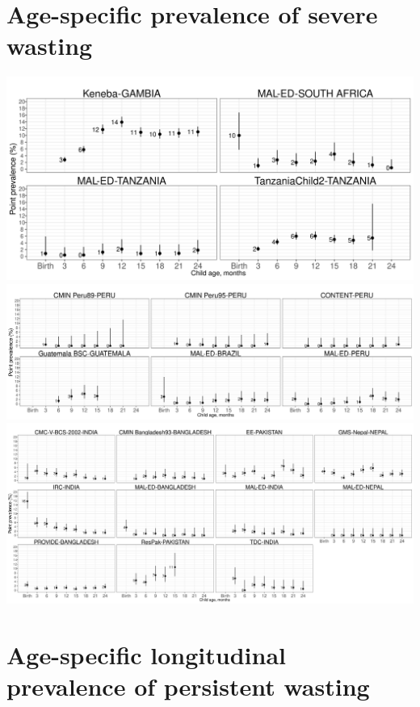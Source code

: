 \documentclass[
  9pt,
]{book}
\begin{document}
\hypertarget{age-specific-prevalence-of-severe-wasting-1}{%
\section{Age-specific prevalence of severe wasting}\label{age-specific-prevalence-of-severe-wasting-1}}

\includegraphics[width=41.67in]{figures//wasting/fig-sevwast_plot_africa}
\includegraphics[width=62.5in]{figures//wasting/fig-sevwast_plot_lam}
\includegraphics[width=75in]{figures//wasting/fig-sevwast_plot_sasia}

\hypertarget{age-specific-longitudinal-prevalence-of-persistent-wasting-1}{%
\section{Age-specific longitudinal prevalence of persistent wasting}\label{age-specific-longitudinal-prevalence-of-persistent-wasting-1}}
\end{document}
